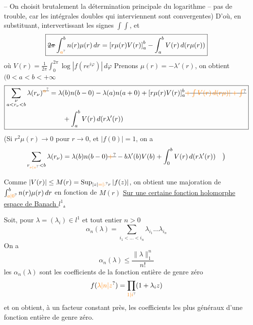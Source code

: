 -- On choisit brutalement la détermination
principale du logarithme -- pas de trouble,
car les intégrales  doubles
qui interviennent sont convergentes)
D'où, en substituant, intervertissant les signes $\int\!\int$, et
\[ \boxed{\displaystyle \deleted{2\pi}\int_{\unsure{a}}^b n(r)\mu(r)\,dr=\left[r\mu(r)V(r)\right]_a^b-\int_a^b V(r)\,d(r\mu(r))} \]
où \qquad \uline{$\displaystyle V(r)=\frac1{2\pi}\int_0^{2\pi}\log|f(re^{i\varphi})|\,d\varphi$}
Prenons $\mu(r)=-\lambda'(r)$, on obtient \enspace $(0<a<b<+\infty$
\[ \boxed{\begin{aligned}\sum_{\substack{\nu\\a<r_\nu<b}}\lambda(r_\nu)^{\deleted{\unsure{\alpha}}}&=\lambda(b)n(b-0)-\lambda(a)n(a+0)+[r\mu(r)V(r)]_a^b\deleted{\unsure{+\int V(r)\,d(r\mu)|+\int}}\\
&\qquad+\int_a^b V(r)\,d(r\lambda'(r))\end{aligned}} \]
(Si $r^2\mu(r)\to0$ pour $r\to0$, et $|f(0)|=1$, on a
\[ \sum_{r_{\unsure{\nu|v}}<b}\lambda(r_\nu)=\lambda(b)n(b-0)\deleted{\unsure{+}}-b\lambda'(b)V(b)+\int_0^b V(r)\,d(r\lambda'(r))\quad\big) \]

Comme $|V(r)|\leq M(r)=\mathop{\rm Sup}_{|z|\unsure{=|:}r}|f(z)|$, on obtient une
majoration de  $\int_{\unsure{a|0}}^b n(r)\mu(r)\,dr$ en fonction
de $M(r)$
\uline{Sur une certaine fonction holomorphe  espace de Banach $l^1$.}

Soit, pour $\lambda=(\lambda_i)\in l^1$ et tout entier $n>0$
\[ \alpha_n(\lambda)=\sum_{i_1<\ldots<i_n}\lambda_{i_1}\ldots\lambda_{i_n} \]
On a
\[ \alpha_n(\lambda)\leq\frac{\|\lambda\|_1^n}{n!} \]
les $\alpha_n(\lambda)$ sont les coefficients de la fonction entière
de genre zéro
\[ f(\unsure{\lambda|n|z})=\prod_{\unsure{1|i}}(1+\lambda_i z) \]
et on obtient, à un facteur constant près, les
coefficients les plus généraux d'une fonction entière
de genre zéro.

